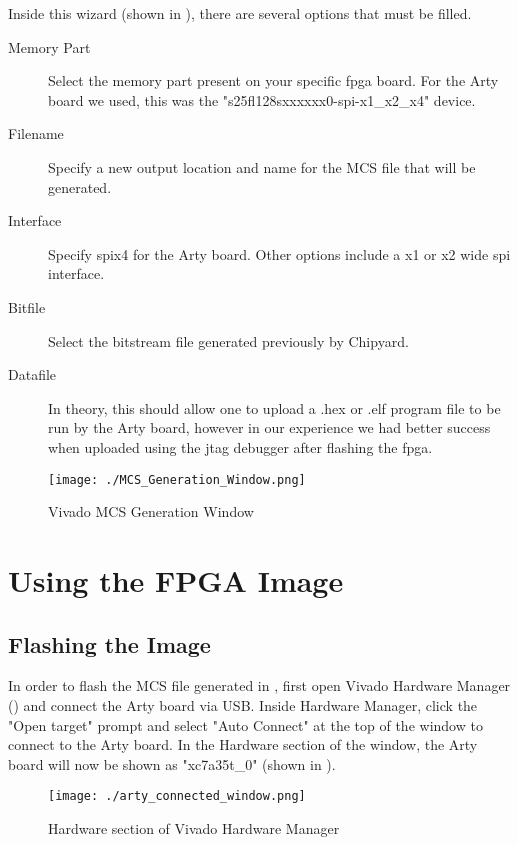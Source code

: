 Inside this wizard (shown in ), there are several options that must be filled.
\begin{description}
\item[Memory Part] Select the memory part present on your specific \Gls{fpga} board.
  For the Arty board we used, this was the "s25fl128sxxxxxx0-spi-x1\_x2\_x4" device.
\item[Filename] Specify a new output location and name for the MCS file that will be generated.
\item[Interface] Specify \Gls{spi}x4 for the Arty board. Other options include a x1 or x2 wide \Gls{spi} interface.
\item[Bitfile] Select the bitstream file generated previously by Chipyard.
\item[Datafile] In theory, this should allow one to upload a .hex or .elf program file to be run by the Arty board, however in our experience we had better success when uploaded using the \Gls{jtag} debugger after flashing the \Gls{fpga}.
\end{description}

\begin{figure}[h!tbp]
  \centering
  \texttt{[image: ./MCS\_Generation\_Window.png]}
  \caption{Vivado MCS Generation Window}
  \label{fig:Vivado_MCS_Window}
\end{figure}

\section{Using the FPGA Image}\label{sec:Using_FPGA_Image}
\subsection{Flashing the Image}\label{sec:Flash_FPGA_Image}
In order to flash the MCS file generated in , first open Vivado Hardware Manager () and connect the Arty board via USB.
Inside Hardware Manager, click the "Open target" prompt and select "Auto Connect" at the top of the window to connect to the Arty board.
In the Hardware section of the window, the Arty board will now be shown as "xc7a35t\_0" (shown in ).

\begin{figure}[h!tbp]
  \centering
  \texttt{[image: ./arty\_connected\_window.png]}
  \caption{Hardware section of Vivado Hardware Manager}
  \label{fig:Vivado_HW_connected}
\end{figure}

